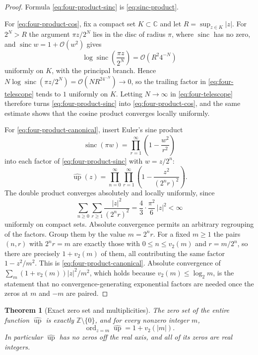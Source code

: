 \documentclass[11pt,oneside]{article}
\newtheorem{theorem}{Theorem}[section]
\theoremstyle{definition}
\theoremstyle{remark}
\newcommand{\C}{\mathbb C}
\newcommand{\Z}{\mathbb Z}
\newcommand{\Up}{\operatorname{up}}
\newcommand{\sinc}{\operatorname{sinc}}
\newcommand{\bigO}{\mathcal O}
\newcommand{\vtwo}{v_2}
\begin{document}
\begin{proof}
Formula \eqref{eq:four-product-sinc} is \eqref{eq:sinc-product}.

For \eqref{eq:four-product-cos}, fix a compact set $K\subset\C$ and let $R=\sup_{z\in K}|z|$.
For $2^N>R$ the argument $\pi z/2^N$ lies in the disc of radius $\pi$, where $\sinc$ has no
zero, and $\sinc w=1+\bigO(w^2)$ gives
\begin{equation*}
 \log\sinc\!\left(\frac{\pi z}{2^N}\right)=\bigO(R^2 4^{-N})
\end{equation*}
uniformly on $K$, with the principal branch.  Hence
$N\log\sinc(\pi z/2^N)=\bigO(NR^24^{-N})\to0$, so the trailing factor in
\eqref{eq:four-telescope} tends to $1$ uniformly on $K$.  Letting $N\to\infty$ in
\eqref{eq:four-telescope} therefore turns \eqref{eq:four-product-sinc} into
\eqref{eq:four-product-cos}, and the same estimate shows that the cosine product converges
locally uniformly.

For \eqref{eq:four-product-canonical}, insert Euler's sine product
\begin{equation}
 \sinc(\pi w)=\prod_{r=1}^{\infty}\left(1-\frac{w^2}{r^2}\right) \label{eq:four-euler-sine}
\end{equation}
into each factor of \eqref{eq:four-product-sinc} with $w=z/2^n$:
\begin{equation}
 \widehat{\Up}(z)
 =\prod_{n=0}^{\infty}\prod_{r=1}^{\infty}
   \left(1-\frac{z^2}{(2^n r)^2}\right).                   \label{eq:four-double-product}
\end{equation}
The double product converges absolutely and locally uniformly, since
\begin{equation*}
 \sum_{n\ge0}\sum_{r\ge1}\frac{|z|^2}{(2^nr)^2}
 =\frac43\cdot\frac{\pi^2}{6}\,|z|^2<\infty
\end{equation*}
uniformly on compact sets.  Absolute convergence permits an arbitrary regrouping of the
factors.  Group them by the value $m=2^nr$.  For a fixed $m\ge1$ the pairs $(n,r)$ with
$2^nr=m$ are exactly those with $0\le n\le\vtwo(m)$ and $r=m/2^n$, so there are precisely
$1+\vtwo(m)$ of them, all contributing the same factor $1-z^2/m^2$.  This is
\eqref{eq:four-product-canonical}.  Absolute convergence of
$\sum_m(1+\vtwo(m))|z|^2/m^2$, which holds because $\vtwo(m)\le\log_2 m$, is the statement
that no convergence-generating exponential factors are needed once the zeros at $m$ and
$-m$ are paired.
\end{proof}

\begin{theorem}[Exact zero set and multiplicities]
\label{thm:four-zeros}
The zero set of the entire function $\widehat{\Up}$ is exactly $\Z\setminus\{0\}$, and for
every nonzero integer $m$,
\begin{equation}
 \operatorname{ord}_{z=m}\widehat{\Up}=1+\vtwo(|m|).       \label{eq:four-zero-order}
\end{equation}
In particular $\widehat{\Up}$ has no zeros off the real axis, and all of its zeros are real
integers.
\end{theorem}
\end{document}

